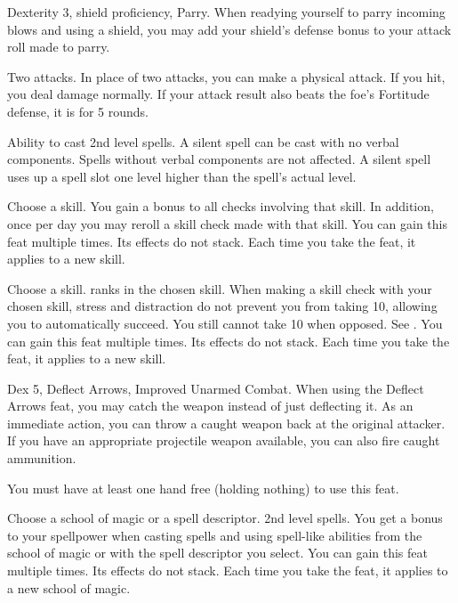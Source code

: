 \featpres Dexterity 3, shield proficiency, Parry.
\featben When readying yourself to parry incoming blows and using a shield, you may add your shield's defense bonus to your attack roll made to parry.

\featpre Two attacks.
\featben In place of two attacks, you can make a physical attack.
If you hit, you deal damage normally.
If your attack result also beats the foe's Fortitude defense, it is \staggered for 5 rounds.

\featpre Ability to cast 2nd level spells.
\featben A silent spell can be cast with no verbal components.
Spells without verbal components are not affected.
A silent spell uses up a spell slot one level higher than the spell's actual level.

Choose a skill.
\featben You gain a  bonus to all checks involving that skill.
In addition, once per day you may reroll a skill check made with that skill.
You can gain this feat multiple times.
Its effects do not stack.
Each time you take the feat, it applies to a new skill.

Choose a skill.
 ranks in the chosen skill.
\featben When making a skill check with your chosen skill, stress and distraction do not prevent you from taking 10, allowing you to automatically succeed.
You still cannot take 10 when opposed.
See .
You can gain this feat multiple times.
Its effects do not stack.
Each time you take the feat, it applies to a new skill.

\featpres
Dex 5, Deflect Arrows, Improved Unarmed Combat.
\featben When using the Deflect Arrows feat, you may catch the weapon instead of just deflecting it.
As an immediate action, you can throw a caught weapon back at the original attacker.
If you have an appropriate projectile weapon available, you can also fire caught ammunition.
\par You must have at least one hand free (holding nothing) to use this feat.

Choose a school of magic or a spell descriptor.
\featpre 2nd level spells.
\featben You get a  bonus to your spellpower when casting spells and using spell-like abilities from the school of magic or with the spell descriptor you select.
You can gain this feat multiple times.
Its effects do not stack.
Each time you take the feat, it applies to a new school of magic.

